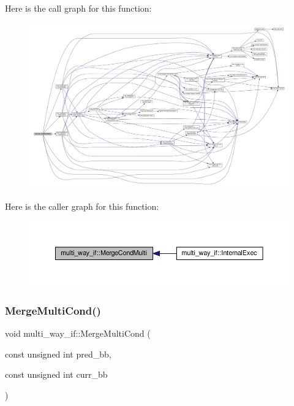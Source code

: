 Here is the call graph for this function\+:
\nopagebreak
\begin{figure}[H]
\begin{center}
\leavevmode
\includegraphics[width=350pt]{dd/dca/classmulti__way__if_ad207368bda4ed43c0b73088848d2521f_cgraph}
\end{center}
\end{figure}
Here is the caller graph for this function\+:
\nopagebreak
\begin{figure}[H]
\begin{center}
\leavevmode
\includegraphics[width=350pt]{dd/dca/classmulti__way__if_ad207368bda4ed43c0b73088848d2521f_icgraph}
\end{center}
\end{figure}
\mbox{\label{classmulti__way__if_a61400a9cda1ead68203f4fa34ca2a120}} 
\subsubsection{\texorpdfstring{Merge\+Multi\+Cond()}{MergeMultiCond()}}
{\footnotesize\ttfamily void multi\+\_\+way\+\_\+if\+::\+Merge\+Multi\+Cond (\begin{DoxyParamCaption}\item[{const unsigned int}]{pred\+\_\+bb,  }\item[{const unsigned int}]{curr\+\_\+bb }\end{DoxyParamCaption})\hspace{0.3cm}{\ttfamily [private]}}



